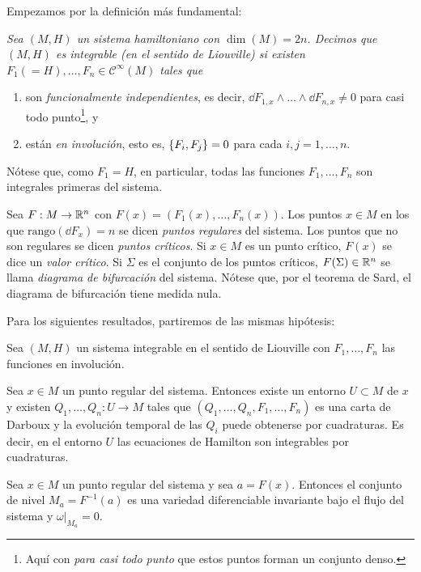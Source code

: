 Empezamos por la definición más fundamental:
\begin{defn}
  \em
  Sea $(M,H)$ un sistema hamiltoniano con $\dim(M)=2n$. Decimos que $(M,H)$ es \emph{integrable (en el sentido de Liouville)} si existen $F_1(=H),\dots,F_n\in \mathcal{C}^{\infty}(M)$ tales que
\begin{enumerate}
  \item son \emph{funcionalmente independientes}, es decir, $\dd F_{1,x}\wedge \dots \wedge \dd F_{n,x}\neq 0$ para casi todo punto\footnote{Aquí con \emph{para casi todo punto} que estos puntos forman un conjunto denso.}, y
  \item están \emph{en involución}, esto es, $\left\lbrace F_i,F_j\right\rbrace=0$ para cada $i,j=1,\dots,n$.
\end{enumerate}
Nótese que, como $F_1=H$, en particular, todas las funciones $F_1,\dots,F_n$ son integrales primeras del sistema.

Sea $F:M\rightarrow \mathbb{R}^n$ con $F(x)=(F_1(x),\dots,F_n(x))$. Los puntos $x\in M$ en los que $\mathrm{rango} (\dd F_x) =n$ se dicen \emph{puntos regulares} del sistema. Los puntos que no son regulares se dicen \emph{puntos críticos}. Si $x\in M$ es un punto crítico, $F(x)$ se dice un \emph{valor crítico}. Si $\Sigma$ es el conjunto de los puntos críticos, $F(\Sigma)\in \mathbb{R}^n$ se llama \emph{diagrama de bifurcación} del sistema.
 Nótese que, por el teorema de Sard, el diagrama de bifurcación tiene medida nula.
\end{defn}



Para los siguientes resultados, partiremos de las mismas hipótesis:

Sea $(M,H)$ un sistema integrable en el sentido de Liouville con $F_1,\dots,F_n$ las funciones en involución.

\begin{thm}[Liouville]
  Sea $x\in M$ un punto regular del sistema. Entonces existe un entorno $U\subset M$ de $x$ y existen $Q_1,\dots,Q_n: U\rightarrow M$ tales que $(Q_1,\dots,Q_n,F_1,\dots,F_n)$ es una carta de Darboux y la evolución temporal de las $Q_i$ puede obtenerse por cuadraturas. Es decir, en el entorno $U$ las ecuaciones de Hamilton son integrables por cuadraturas.
\end{thm}

\begin{prop}
  Sea $x\in M$ un punto regular del sistema y sea $a=F(x)$. Entonces el conjunto de nivel $M_a=F^{-1}(a)$ es una variedad diferenciable invariante bajo el flujo del sistema y $\left. \omega \right|_{M_a}=0$.
\end{prop}

